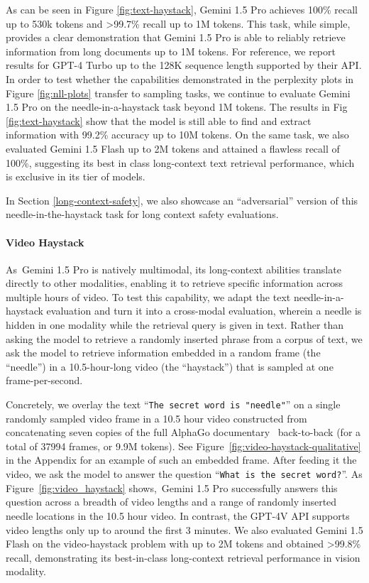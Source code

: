 As can be seen in Figure \ref{fig:text-haystack}, Gemini 1.5 Pro achieves 100\% recall up to 530k tokens and >99.7\% recall up to 1M tokens. This task, while simple, provides a clear demonstration that Gemini 1.5 Pro is able to reliably retrieve information from long documents up to 1M tokens. For reference, we report results for GPT-4 Turbo up to the 128K sequence length supported by their API. In order to test whether the capabilities demonstrated in the perplexity plots in Figure \ref{fig:nll-plots} transfer to sampling tasks, we continue to evaluate Gemini 1.5 Pro on the needle-in-a-haystack task beyond 1M tokens. The results in Fig \ref{fig:text-haystack} show that the model is still able to find and extract information with 99.2\% accuracy up to 10M tokens. On the same task, we also evaluated Gemini 1.5 Flash up to 2M tokens and attained a flawless recall of 100\%, suggesting its best in class long-context text retrieval performance, which is exclusive in its tier of models.

In Section \ref{long-context-safety}, we also showcase an ``adversarial'' version of this needle-in-the-haystack task for long context safety evaluations.

\paragraph{Video Haystack}

As~Gemini 1.5 Pro is natively multimodal, its long-context abilities translate directly to other modalities, enabling it to retrieve specific information across multiple hours of video. To test this capability, we adapt the text needle-in-a-haystack evaluation and turn it into a cross-modal evaluation, wherein a needle is hidden in one modality while the retrieval query is given in text. Rather than asking the model to retrieve a randomly inserted phrase from a corpus of text, we ask the model to retrieve information embedded in a random frame (the ``needle'') in a 10.5-hour-long video (the ``haystack'') that is sampled at one frame-per-second.

Concretely, we overlay the text ``\texttt{The secret word is "needle"}'' on a single randomly sampled video frame in a 10.5 hour video constructed from concatenating seven copies of the full AlphaGo documentary~\cite{AlphaGo2017} back-to-back (for a total of 37994 frames, or 9.9M tokens). See Figure~\ref{fig:video-haystack-qualitative} in the Appendix for an example of such an embedded frame. After feeding it the video, we ask the model to answer the question ``\texttt{What is the secret word?}''. As Figure~\ref{fig:video_haystack} shows,~Gemini 1.5 Pro successfully answers this question across a breadth of video lengths and a range of randomly inserted needle locations in the 10.5 hour video. In contrast, the GPT-4V API supports video lengths only up to around the first 3 minutes. We also evaluated Gemini 1.5 Flash on the video-haystack problem with up to 2M tokens and obtained >99.8\% recall, demonstrating its best-in-class long-context retrieval performance in vision modality.

